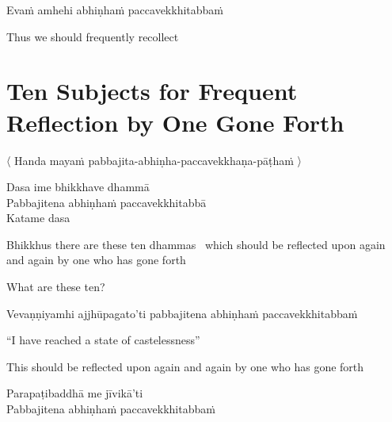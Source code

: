 Evaṁ amhehi abhiṇhaṁ paccavekkhitabbaṁ

\begin{english}
  Thus we should frequently recollect
\end{english}

\suttaRef{[AN 5.57]}


\section{Ten Subjects for Frequent Reflection by One Gone Forth}
\label{ten-recollections}

\begin{leader}
  〈 Handa mayaṁ pabbajita-abhiṇha-paccavekkhaṇa-pāṭhaṁ 〉
\end{leader}

Dasa ime bhikkhave dhammā\\
Pabbajitena abhiṇhaṁ paccavekkhitabbā\\
Katame dasa

\begin{english-hang}
  Bhikkhus there are these ten dhammas
  \breathmark\ which should be reflected upon again and again by one who has gone forth\\
\end{english-hang}

\begin{english}
  What are these ten?
\end{english}

\begin{pali-hang}
Vevaṇṇiyamhi ajjhūpagato'ti pabbajitena abhiṇhaṁ paccavekkhitabbaṁ
\end{pali-hang}

\begin{english}
  ``I have reached a state of castelessness''\\
\end{english}

\begin{english-hang}
  This should be reflected upon again and again by one who has gone forth
\end{english-hang}

Parapaṭibaddhā me jīvikā'ti\\
Pabbajitena abhiṇhaṁ paccavekkhitabbaṁ

